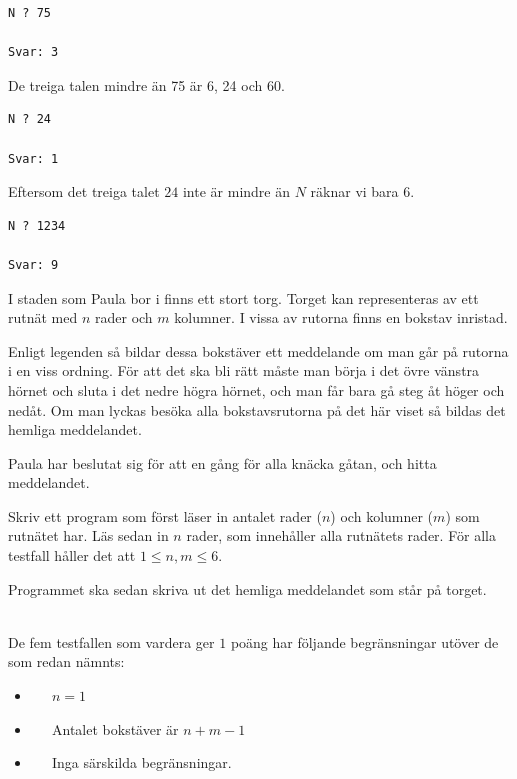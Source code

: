\begin{verbatim}
N ? 75

Svar: 3
\end{verbatim}

 De treiga talen mindre än 75 är 6, 24 och 60.

\vspace{0.5cm}

\begin{verbatim}
N ? 24

Svar: 1
\end{verbatim}

 Eftersom det treiga talet $24$ inte är mindre än $N$ räknar vi bara 6.

\vspace{0.5cm}

\begin{verbatim}
N ? 1234

Svar: 9
\end{verbatim}



\newpage
{}

I staden som Paula bor i finns ett stort torg. Torget kan representeras av ett 
rutnät med $n$ rader och $m$ kolumner. I vissa av rutorna finns en bokstav 
inristad. 

Enligt legenden så bildar dessa bokstäver ett meddelande om man 
går på rutorna i en viss ordning. För att det ska bli rätt måste man börja 
i det övre vänstra hörnet och sluta i det nedre högra hörnet, och man får bara gå steg åt höger 
och nedåt. Om man lyckas besöka alla bokstavsrutorna på det här viset så bildas 
det hemliga meddelandet.

Paula har beslutat sig för att en gång för alla knäcka gåtan, och hitta meddelandet.

Skriv ett program som först läser in antalet rader ($n$) och kolumner ($m$) som rutnätet har. Läs sedan
in $n$ rader, som innehåller alla rutnätets rader. För alla testfall håller det att $1 \leq n,m \leq 6$.

Programmet ska sedan skriva ut det hemliga meddelandet som står på torget.

\vspace{0.5cm}
\\
De fem testfallen som vardera ger $1$ poäng har följande begränsningar utöver de som redan nämnts:
\begin{itemize}
    \item[(1)]   $\;\;\;\;$ $n=1$    
    \item[(2-3)] $\;\;\;\;$ Antalet bokstäver är $n+m-1$ 
    \item[(4-5)] $\;\;\;\;$ Inga särskilda begränsningar.
\end{itemize}

